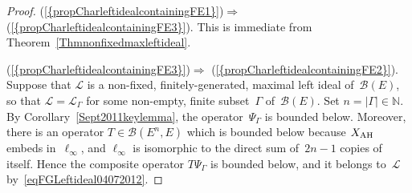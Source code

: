 \documentclass[12pt]{amsart}
\theoremstyle{definition}
\numberwithin{equation}{section}
\begin{document}
\begin{proof}
  {{\normalfont\textrm{(\ref{{propCharleftidealcontainingFE1}})}}}$\Rightarrow$  {{\normalfont\textrm{(\ref{{propCharleftidealcontainingFE3}})}}}.  This is immediate
  from Theorem~\ref{Thmnonfixedmaxleftideal}.

  {{\normalfont\textrm{(\ref{{propCharleftidealcontainingFE3}})}}}$\Rightarrow$  {{\normalfont\textrm{(\ref{{propCharleftidealcontainingFE2}})}}}. Suppose that $\mathscr{L}$
  is a non-fixed, finitely-generated, maximal left ideal
  of~$\mathscr{B}(E)$, so that $\mathscr{L} = \mathscr{L}_{\Gamma}$
  for some non-empty, finite subset~$\Gamma$ of~$\mathscr{B}(E)$. Set
  $n = |\Gamma|\in{\ensuremath{\mathbb{N}}}$.  By Corollary~\ref{Sept2011keylemma}, the
  operator~$\Psi_{\Gamma}$ is bounded below.  Moreover, there is an
  operator \mbox{$T\in\mathscr{B}(E^n,E)$} which is bounded below
  because $X_{\text{\normalfont{AH}}}$ embeds in~$\ell_\infty$, and
  $\ell_\infty$ is isomorphic to the direct sum of~$2n-1$ copies of
  itself. Hence the composite operator $T\Psi_{\Gamma}$ is bounded
  below, and it belongs to~$\mathscr{L}$
  by~\eqref{eqFGLeftideal04072012}.


\end{proof}
\end{document}
